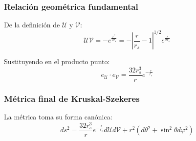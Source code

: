 \subsubsection{Relación geométrica fundamental}
De la definición de \( \mathcal{U} \) y \( \mathcal{V} \):
\begin{equation}
    \mathcal{U}\mathcal{V} = -e^{\frac{r^*}{2r_s}} = -\left|\frac{r}{r_s}-1\right|^{1/2}e^{\frac{r}{2r_s}}
\end{equation}

Sustituyendo en el producto punto:
\begin{equation}
    e_\mathcal{U} \cdot e_\mathcal{V} = \frac{32r_s^3}{r}e^{-\frac{r}{r_s}}
\end{equation}

\subsubsection{Métrica final de Kruskal-Szekeres}
La métrica toma su forma canónica:
\begin{equation}
    \boxed{ds^2 = \frac{32r_s^3}{r}e^{-\frac{r}{r_s}} d\mathcal{U}d\mathcal{V} + r^2(d\theta^2 + \sin^2\theta d\varphi^2)}
\end{equation}

